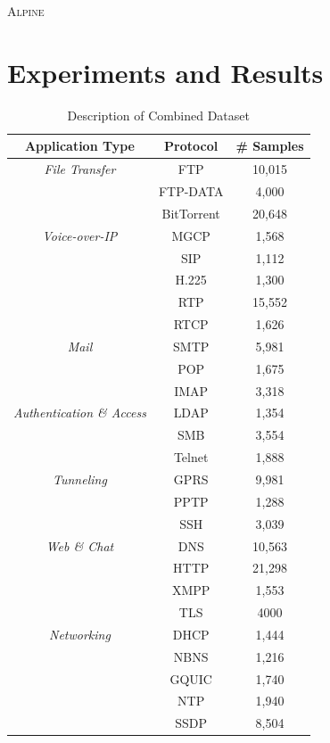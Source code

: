\textsc{Alpine}\section{Experiments and Results}
\begin{table} [ht!]
\caption{Description of Combined Dataset}
\centering
\begin{tabular}{|c |c | c |}
\hline
\textbf{Application Type} & \textbf{Protocol} & \textbf{\# Samples} \\
\hline
\hline
\textit{File Transfer} & FTP & 10,015 \\
& FTP-DATA & 4,000 \\
& BitTorrent &  20,648 \\
\hline
\hline
\textit{Voice-over-IP} & MGCP & 1,568 \\
& SIP & 1,112 \\
& H.225 &  1,300 \\
& RTP &  15,552 \\
& RTCP &  1,626 \\
\hline
\hline
\textit{Mail} & SMTP & 5,981 \\
& POP & 1,675 \\
& IMAP &  3,318 \\
\hline
\hline
\textit{Authentication \& Access} & LDAP & 1,354 \\
& SMB &  3,554 \\
& Telnet & 1,888 \\
\hline
\hline
\textit{Tunneling} & GPRS & 9,981 \\
& PPTP & 1,288 \\
& SSH & 3,039 \\
\hline
\hline
\textit{Web \& Chat} & DNS & 10,563 \\
& HTTP & 21,298 \\
& XMPP &  1,553 \\
& TLS & 4000 \\
\hline
\hline
\textit{Networking} & DHCP & 1,444 \\
& NBNS & 1,216 \\
& GQUIC &  1,740 \\
& NTP & 1,940 \\
& SSDP &  8,504 \\
\hline
\end{tabular}
\label{table:dataset}
\end{table}


